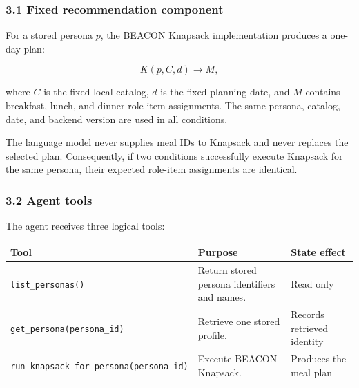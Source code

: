 \documentclass[
  10pt,
  letterpaper,
]{article}
\begin{document}
\subsubsection{3.1 Fixed recommendation
component}\label{fixed-recommendation-component}

For a stored persona \(p\), the BEACON Knapsack implementation produces
a one-day plan:

\[
K(p, C, d) \rightarrow M,
\]

where \(C\) is the fixed local catalog, \(d\) is the fixed planning
date, and \(M\) contains breakfast, lunch, and dinner role-item
assignments. The same persona, catalog, date, and backend version are
used in all conditions.

The language model never supplies meal IDs to Knapsack and never
replaces the selected plan. Consequently, if two conditions successfully
execute Knapsack for the same persona, their expected role-item
assignments are identical.

\subsubsection{3.2 Agent tools}\label{agent-tools}

The agent receives three logical tools:

\begin{longtable}[]{@{}
  >{\raggedright\arraybackslash}p{}
  >{\raggedright\arraybackslash}p{}
  >{\raggedright\arraybackslash}p{}@{}}
\toprule\noalign{}
\begin{minipage}[b]{\linewidth}\raggedright
Tool
\end{minipage} & \begin{minipage}[b]{\linewidth}\raggedright
Purpose
\end{minipage} & \begin{minipage}[b]{\linewidth}\raggedright
State effect
\end{minipage} \\
\midrule\noalign{}
\endhead
\bottomrule\noalign{}
\endlastfoot
\texttt{list\_personas()} & Return stored persona identifiers and names.
& Read only \\
\texttt{get\_persona(persona\_id)} & Retrieve one stored profile. &
Records retrieved identity \\
\texttt{run\_knapsack\_for\_persona(persona\_id)} & Execute BEACON
Knapsack. & Produces the meal plan \\
\end{longtable}
\end{document}

